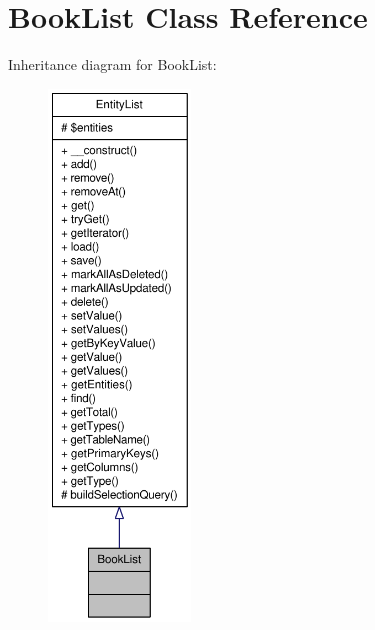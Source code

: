 \hypertarget{classBookList}{
\section{BookList Class Reference}
\label{classBookList}
}


Inheritance diagram for BookList:\nopagebreak
\begin{figure}[H]
\begin{center}
\leavevmode
\includegraphics[height=400pt]{classBookList__inherit__graph}
\end{center}
\end{figure}


